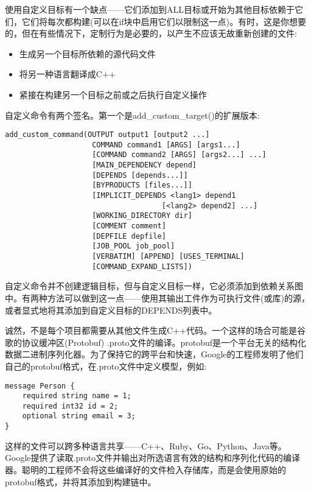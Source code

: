 
使用自定义目标有一个缺点——它们添加到ALL目标或开始为其他目标依赖于它们，它们将每次都构建(可以在if块中启用它们以限制这一点)。有时，这是你想要的，但在有些情况下，定制行为是必要的，以产生不应该无故重新创建的文件:

\begin{itemize}
\item 
生成另一个目标所依赖的源代码文件

\item 
将另一种语言翻译成C++

\item 
紧接在构建另一个目标之前或之后执行自定义操作
\end{itemize}

自定义命令有两个签名。第一个是add\_custom\_target()的扩展版本:

\begin{lstlisting}[style=styleCMake]
add_custom_command(OUTPUT output1 [output2 ...]
					COMMAND command1 [ARGS] [args1...]
					[COMMAND command2 [ARGS] [args2...] ...]
					[MAIN_DEPENDENCY depend]
					[DEPENDS [depends...]]
					[BYPRODUCTS [files...]]
					[IMPLICIT_DEPENDS <lang1> depend1
									[<lang2> depend2] ...]
					[WORKING_DIRECTORY dir]
					[COMMENT comment]
					[DEPFILE depfile]
					[JOB_POOL job_pool]
					[VERBATIM] [APPEND] [USES_TERMINAL]
					[COMMAND_EXPAND_LISTS])
\end{lstlisting}

自定义命令并不创建逻辑目标，但与自定义目标一样，它必须添加到依赖关系图中。有两种方法可以做到这一点——使用其输出工件作为可执行文件(或库)的源，或者显式地将其添加到自定义目标的DEPENDS列表中。


诚然，不是每个项目都需要从其他文件生成C++代码。一个这样的场合可能是谷歌的协议缓冲区(Protobuf) .proto文件的编译。protobuf是一个平台无关的结构化数据二进制序列化器。为了保持它的跨平台和快速，Google的工程师发明了他们自己的protobuf格式，在.proto文件中定义模型，例如:

\begin{lstlisting}[style=styleCMake]
message Person {
	required string name = 1;
	required int32 id = 2;
	optional string email = 3;
}
\end{lstlisting}

这样的文件可以跨多种语言共享——C++、Ruby、Go、Python、Java等。Google提供了读取.proto文件并输出对所选语言有效的结构和序列化代码的编译器。聪明的工程师不会将这些编译好的文件检入存储库，而是会使用原始的protobuf格式，并将其添加到构建链中。

